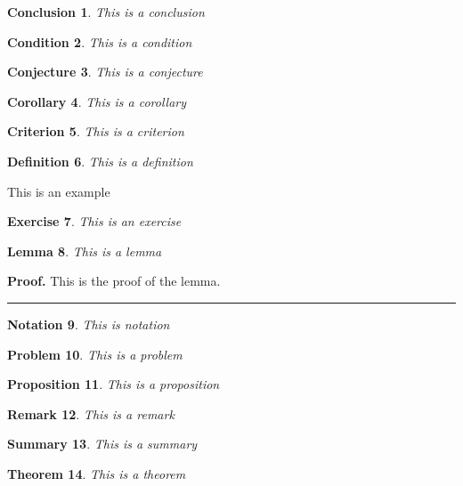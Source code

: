 \documentclass{book}%
\newtheorem{theorem}{Theorem}
\newtheorem{conclusion}[theorem]{Conclusion}
\newtheorem{condition}[theorem]{Condition}
\newtheorem{conjecture}[theorem]{Conjecture}
\newtheorem{corollary}[theorem]{Corollary}
\newtheorem{criterion}[theorem]{Criterion}
\newtheorem{definition}[theorem]{Definition}
\newtheorem{exercise}[theorem]{Exercise}
\newtheorem{lemma}[theorem]{Lemma}
\newtheorem{notation}[theorem]{Notation}
\newtheorem{problem}[theorem]{Problem}
\newtheorem{proposition}[theorem]{Proposition}
\newtheorem{remark}[theorem]{Remark}
\newtheorem{summary}[theorem]{Summary}
\newenvironment{proof}[1][Proof]{\noindent\textbf{#1.} }{\ \rule{0.5em}{0.5em}}
\begin{document}
\begin{conclusion}
This is a conclusion
\end{conclusion}

\begin{condition}
This is a condition
\end{condition}

\begin{conjecture}
This is a conjecture
\end{conjecture}

\begin{corollary}
This is a corollary
\end{corollary}

\begin{criterion}
This is a criterion
\end{criterion}

\begin{definition}
This is a definition
\end{definition}

\begin{example}
This is an example
\end{example}

\begin{exercise}
This is an exercise
\end{exercise}

\begin{lemma}
This is a lemma
\end{lemma}

\begin{proof}
This is the proof of the lemma.
\end{proof}

\begin{notation}
This is notation
\end{notation}

\begin{problem}
This is a problem
\end{problem}

\begin{proposition}
This is a proposition
\end{proposition}

\begin{remark}
This is a remark
\end{remark}

\begin{summary}
This is a summary
\end{summary}

\begin{theorem}
This is a theorem
\end{theorem}
\end{document}
